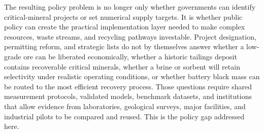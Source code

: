 \documentclass[12pt,a4paper]{article}
\begin{document}
The resulting policy problem is no longer only whether governments can identify critical-mineral projects or set numerical supply targets. It is whether public policy can create the practical implementation layer needed to make complex resources, waste streams, and recycling pathways investable. Project designation, permitting reform, and strategic lists do not by themselves answer whether a low-grade ore can be liberated economically, whether a historic tailings deposit contains recoverable critical minerals, whether a brine or sorbent will retain selectivity under realistic operating conditions, or whether battery black mass can be routed to the most efficient recovery process. Those questions require shared measurement protocols, validated models, benchmark datasets, and institutions that allow evidence from laboratories, geological surveys, major facilities, and industrial pilots to be compared and reused. This is the policy gap addressed here.
\end{document}
